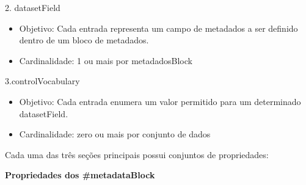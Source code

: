 \documentclass[12pt,hidelinks]{article}
\begin{document}
2. datasetField

\begin{itemize}

\item Objetivo: Cada entrada representa um campo de metadados a ser definido dentro de um bloco de metadados.

\item Cardinalidade: 1 ou mais por metadadosBlock

\end{itemize}

3.controlVocabulary

\begin{itemize}

\item Objetivo: Cada entrada enumera um valor permitido para um determinado datasetField.

\item Cardinalidade: zero ou mais por conjunto de dados

\end{itemize}

Cada uma das três seções principais possui conjuntos de propriedades:

\newpage

\textbf{Propriedades dos \#metadataBlock}\\
\end{document}
